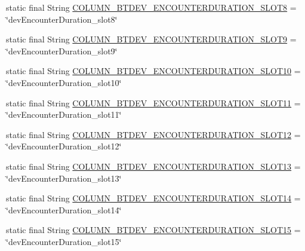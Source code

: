\begin{DoxyCompactItemize}
\item 
static final String \hyperlink{classcs_1_1nsense_1_1db_1_1_n_sense_s_q_lite_helper_a8c6784f810d8c7bb70d0864e9c389f43}{C\-O\-L\-U\-M\-N\-\_\-\-B\-T\-D\-E\-V\-\_\-\-E\-N\-C\-O\-U\-N\-T\-E\-R\-D\-U\-R\-A\-T\-I\-O\-N\-\_\-\-S\-L\-O\-T8} = \char`\"{}dev\-Encounter\-Duration\-\_\-slot8\char`\"{}
\item 
static final String \hyperlink{classcs_1_1nsense_1_1db_1_1_n_sense_s_q_lite_helper_a67878d3b8c7fd4fef8e3a50147ee8f80}{C\-O\-L\-U\-M\-N\-\_\-\-B\-T\-D\-E\-V\-\_\-\-E\-N\-C\-O\-U\-N\-T\-E\-R\-D\-U\-R\-A\-T\-I\-O\-N\-\_\-\-S\-L\-O\-T9} = \char`\"{}dev\-Encounter\-Duration\-\_\-slot9\char`\"{}
\item 
static final String \hyperlink{classcs_1_1nsense_1_1db_1_1_n_sense_s_q_lite_helper_a7a292db5cf93e4b1583ca56267cabaab}{C\-O\-L\-U\-M\-N\-\_\-\-B\-T\-D\-E\-V\-\_\-\-E\-N\-C\-O\-U\-N\-T\-E\-R\-D\-U\-R\-A\-T\-I\-O\-N\-\_\-\-S\-L\-O\-T10} = \char`\"{}dev\-Encounter\-Duration\-\_\-slot10\char`\"{}
\item 
static final String \hyperlink{classcs_1_1nsense_1_1db_1_1_n_sense_s_q_lite_helper_a2a7d11fcb1f954f0cda9b0b5488d7f72}{C\-O\-L\-U\-M\-N\-\_\-\-B\-T\-D\-E\-V\-\_\-\-E\-N\-C\-O\-U\-N\-T\-E\-R\-D\-U\-R\-A\-T\-I\-O\-N\-\_\-\-S\-L\-O\-T11} = \char`\"{}dev\-Encounter\-Duration\-\_\-slot11\char`\"{}
\item 
static final String \hyperlink{classcs_1_1nsense_1_1db_1_1_n_sense_s_q_lite_helper_a97ea5d9c1ef3e460d54e87a12b1475fe}{C\-O\-L\-U\-M\-N\-\_\-\-B\-T\-D\-E\-V\-\_\-\-E\-N\-C\-O\-U\-N\-T\-E\-R\-D\-U\-R\-A\-T\-I\-O\-N\-\_\-\-S\-L\-O\-T12} = \char`\"{}dev\-Encounter\-Duration\-\_\-slot12\char`\"{}
\item 
static final String \hyperlink{classcs_1_1nsense_1_1db_1_1_n_sense_s_q_lite_helper_a91ca35edc69c8784edc52e460e404538}{C\-O\-L\-U\-M\-N\-\_\-\-B\-T\-D\-E\-V\-\_\-\-E\-N\-C\-O\-U\-N\-T\-E\-R\-D\-U\-R\-A\-T\-I\-O\-N\-\_\-\-S\-L\-O\-T13} = \char`\"{}dev\-Encounter\-Duration\-\_\-slot13\char`\"{}
\item 
static final String \hyperlink{classcs_1_1nsense_1_1db_1_1_n_sense_s_q_lite_helper_a31c1166964baa1fdf97a97a9f72ac07e}{C\-O\-L\-U\-M\-N\-\_\-\-B\-T\-D\-E\-V\-\_\-\-E\-N\-C\-O\-U\-N\-T\-E\-R\-D\-U\-R\-A\-T\-I\-O\-N\-\_\-\-S\-L\-O\-T14} = \char`\"{}dev\-Encounter\-Duration\-\_\-slot14\char`\"{}
\item 
static final String \hyperlink{classcs_1_1nsense_1_1db_1_1_n_sense_s_q_lite_helper_abeaba69baab42467bc450b18a4b3e26c}{C\-O\-L\-U\-M\-N\-\_\-\-B\-T\-D\-E\-V\-\_\-\-E\-N\-C\-O\-U\-N\-T\-E\-R\-D\-U\-R\-A\-T\-I\-O\-N\-\_\-\-S\-L\-O\-T15} = \char`\"{}dev\-Encounter\-Duration\-\_\-slot15\char`\"{}

\end{DoxyCompactItemize}
